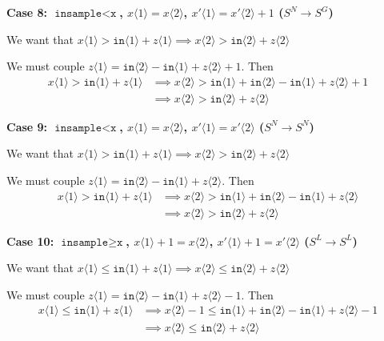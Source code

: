\documentclass[12pt]{article}
\newcommand{\gguard}[1][x]{\texttt{insample}\geq \texttt{#1}}
\newcommand{\lguard}[1][x]{\texttt{insample} < \texttt{#1}}
\newcommand{\brangle}[1]{\langle #1 \rangle}
\theoremstyle{definition}
\begin{document}
\textbf{Case 8: $\lguard$, $x\brangle{1}  = x \brangle{2}$, $x'\langle 1 \rangle  = x' \langle 2\rangle+1$ ($S^N\to S^G$)}

We want that $x\langle 1 \rangle > \texttt{in}\langle 1\rangle + z\brangle{1}\implies x \brangle{2} > \texttt{in}\brangle{2} + z\brangle{2}$

We must couple $z\brangle{1} =\texttt{in}\brangle{2}-\texttt{in}\brangle{1} +z\brangle{2}+1$.
Then \begin{align*}
	x\langle 1 \rangle > \texttt{in}\langle 1\rangle + z\brangle{1}&\implies x\brangle{2} > \texttt{in}\brangle{1} + \texttt{in}\brangle{2}-\texttt{in}\brangle{1} +z\brangle{2}+1\\
	&\implies x\brangle{2} > \texttt{in}\brangle{2} + z\brangle{2}
\end{align*}

\textbf{Case 9: $\lguard$, $x\brangle{1}  = x \brangle{2}$, $x'\langle 1 \rangle  = x' \langle 2\rangle$ ($S^N\to S^N$)}

We want that $x\langle 1 \rangle > \texttt{in}\langle 1\rangle + z\brangle{1}\implies x \brangle{2} > \texttt{in}\brangle{2} + z\brangle{2}$

We must couple $z\brangle{1} =\texttt{in}\brangle{2}-\texttt{in}\brangle{1} +z\brangle{2}$.
Then \begin{align*}
	x\langle 1 \rangle > \texttt{in}\langle 1\rangle + z\brangle{1}&\implies x\brangle{2} > \texttt{in}\brangle{1} + \texttt{in}\brangle{2}-\texttt{in}\brangle{1} +z\brangle{2}\\
	&\implies x\brangle{2}  > \texttt{in}\brangle{2} + z\brangle{2}
\end{align*}

\textbf{Case 10: $\gguard$, $x\brangle{1}  +1= x \brangle{2}$, $x'\brangle{1} +1 = x' \brangle{2}$ ($S^L\to S^L$)}

We want that $x\langle 1 \rangle \leq \texttt{in}\langle 1\rangle + z\brangle{1}\implies x \brangle{2} \leq \texttt{in}\brangle{2} + z\brangle{2}$

We must couple $z\brangle{1} =\texttt{in}\brangle{2}-\texttt{in}\brangle{1} +z\brangle{2}-1$.
Then \begin{align*}
	x\langle 1 \rangle \leq \texttt{in}\langle 1\rangle + z\brangle{1}&\implies x\brangle{2}-1 \leq \texttt{in}\brangle{1} + \texttt{in}\brangle{2}-\texttt{in}\brangle{1} +z\brangle{2}-1\\
	&\implies x\brangle{2} \leq \texttt{in}\brangle{2} + z\brangle{2}
\end{align*}
\end{document}
